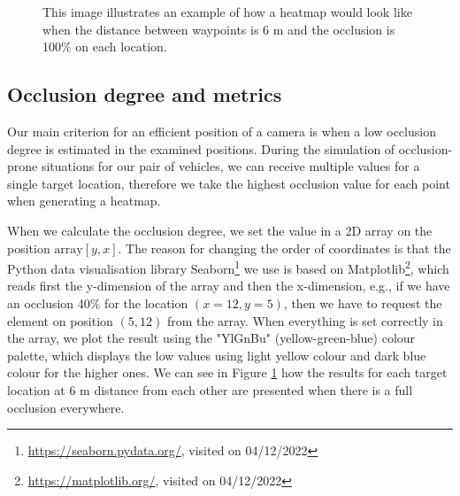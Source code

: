 \begin{figure} [h!]
    \centering
    
    \caption[Heatmap target full occlusion]{This image illustrates an example of how a heatmap would look like when the distance between waypoints is 6 m and the occlusion is 100\% on each location.}
    \label{fig:heatmap_target}
\end{figure}
 
\subsection{Occlusion degree and metrics} \label{subsec:metrics}
Our main criterion for an efficient position of a camera is when a low occlusion degree is estimated in the examined positions. During the simulation of occlusion-prone situations for our pair of vehicles, we can receive multiple values for a single target location, therefore we take the highest occlusion value for each point when generating a heatmap. 


When we calculate the occlusion degree, we set the value in a 2D array on the position $\textrm{array}[y,x]$. The reason for changing the order of coordinates is that the Python data visualisation library Seaborn\footnote{\url{https://seaborn.pydata.org/}, visited on 04/12/2022} we use is based on Matplotlib\footnote{\url{https://matplotlib.org/}, visited on 04/12/2022}, which reads first the y-dimension of the array and then the x-dimension, e.g., if we have an occlusion 40\% for the location $(x=12,y=5)$, then we have to request the element on position $(5,12)$ from the array. When everything is set correctly in the array, we plot the result using the "YlGnBu" (yellow-green-blue) colour palette, which displays the low values using light yellow colour and dark blue colour for the higher ones. We can see in Figure \ref{fig:heatmap_target} how the results for each target location at 6 m distance from each other are presented when there is a full occlusion everywhere. 

